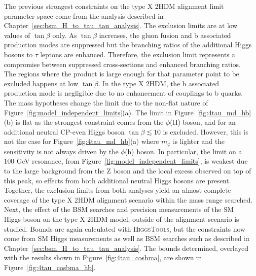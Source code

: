 The previous strongest constraints on the type X \ac{2HDM} alignment limit parameter space come from the analysis described in Chapter~\ref{sec:bsm_H_to_tau_tau_analysis}.
The exclusion limits are at low values of $\tan\beta$ only.
As $\tan\beta$ increases, the gluon fusion and b associated production modes are suppressed but the branching ratios of the additional Higgs bosons to $\tau$ leptons are enhanced.
Therefore, the exclusion limit represents a compromise between suppressed cross-sections and enhanced branching ratios. 
The regions where the product is large enough for that parameter point to be excluded happens at low $\tan\beta$.
In the type X \ac{2HDM}, the b associated production mode is negligible due to no enhancement of couplings to b quarks.
The mass hypotheses change the limit due to the non-flat nature of Figure~\ref{fig:model_independent_limits}(a).
The limit in Figure~\ref{fig:4tau_md_hb}(b) is flat as the strongest constraint comes from the $\phi$(H) boson, and for an additional neutral \ac{CP}-even Higgs boson $\tan\beta \lesssim 10$ is excluded.
However, this is not the case for Figure~\ref{fig:4tau_md_hb}(a) where $m_{\phi}$ is lighter and the sensitivity is not always driven by the $\phi$(h) boson.
In particular, the limit on a 100 GeV resonance, from Figure~\ref{fig:model_independent_limits}, is weakest due to the large background from the Z boson and the local excess observed on top of this peak, so effects from both additional neutral Higgs bosons are present.
Together, the exclusion limits from both analyses yield an almost complete coverage of the type X 2HDM alignment scenario within the mass range searched. \\

Next, the effect of the \ac{BSM} searches and precision measurements of the \ac{SM} Higgs boson on the type X \ac{2HDM} model, outside of the alignment scenario is studied.
Bounds are again calculated with \textsc{HiggsTools}, but the constraints now come from \ac{SM} Higgs measurements as well as \ac{BSM} searches such as described in Chapter~\ref{sec:bsm_H_to_tau_tau_analysis}.
The bounds determined, overlayed with the results shown in Figure~\ref{fig:4tau_cosbma}, are shown in Figure~\ref{fig:4tau_cosbma_hb}. \\


